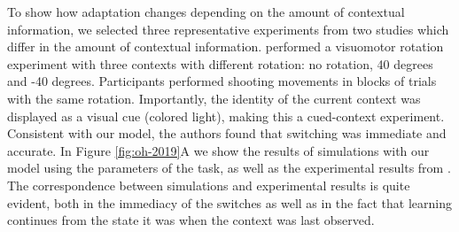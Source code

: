\documentclass[a4paper,doc,floatsintext,natbib]{apa6}
\def \fref #1{Figure \ref{#1}}     %
\begin{document}
To show how adaptation changes depending on the amount of contextual information, we selected three representative experiments from two studies which differ in the amount of contextual information. \cite{Kim_Neural_2015} performed a visuomotor rotation experiment with three contexts with different rotation: no rotation, 40 degrees and -40 degrees. Participants performed shooting movements in blocks of trials with the same rotation. Importantly, the identity of the current context was displayed as a visual cue (colored light), making this a cued-context experiment. Consistent with our model, the authors found that switching was immediate and accurate. In \fref{fig:oh-2019}A we show the results of simulations with our model using the parameters of the task, as well as the experimental results from \cite{Kim_Neural_2015}. The correspondence between simulations and experimental results is quite evident, both in the immediacy of the switches as well as in the fact that learning continues from the state it was when the context was last observed.
\end{document}
